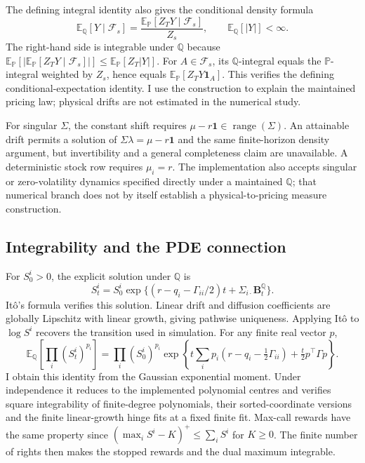 \documentclass[11pt]{article}
\newcommand{\E}{\mathbb E}
\newcommand{\Q}{\mathbb Q}
\newcommand{\F}{\mathcal F}
\begin{document}
The defining integral identity also gives the conditional density formula
\begin{equation}
 \E_\Q[Y\mid\F_s]
 =\frac{\E_{\mathbb P}[Z_TY\mid\F_s]}{Z_s},
 \qquad \E_\Q[|Y|]<\infty.
\label{eq:foundation-conditional-density}
\end{equation}
The right-hand side is integrable under $\Q$ because $\E_{\mathbb P}[|\E_{\mathbb P}[Z_TY\mid\F_s]|]\leq\E_{\mathbb P}[Z_T|Y|]$. For $A\in\F_s$, its $\Q$-integral equals the $\mathbb P$-integral weighted by $Z_s$, hence equals $\E_{\mathbb P}[Z_TY\mathbf1_A]$. This verifies the defining conditional-expectation identity. I use the construction to explain the maintained pricing law; physical drifts are not estimated in the numerical study.

For singular $\Sigma$, the constant shift requires $\mu-r\mathbf1\in\operatorname{range}(\Sigma)$. An attainable drift permits a solution of $\Sigma\lambda=\mu-r\mathbf1$ and the same finite-horizon density argument, but invertibility and a general completeness claim are unavailable. A deterministic stock row requires $\mu_i=r$. The implementation also accepts singular or zero-volatility dynamics specified directly under a maintained $\Q$; that numerical branch does not by itself establish a physical-to-pricing measure construction.

\subsection{Integrability and the PDE connection}

For $S_0^i>0$, the explicit solution under $\Q$ is
\begin{equation}
 S_t^i=S_0^i\exp\{(r-q_i-\Gamma_{ii}/2)t
                          +\Sigma_{i\cdot}\mathbf B_t^\Q\}.
\label{eq:foundation-explicit-sde}
\end{equation}
It\^o's formula verifies this solution. Linear drift and diffusion coefficients are globally Lipschitz with linear growth, giving pathwise uniqueness. Applying It\^o to $\log S^i$ recovers the transition used in simulation. For any finite real vector $p$,
\begin{equation}
 \E_\Q\!\left[\prod_i(S_t^i)^{p_i}\right]
 =\prod_i(S_0^i)^{p_i}
 \exp\!\left\{t\sum_i p_i(r-q_i-\tfrac12\Gamma_{ii})
                  +\tfrac t2 p^\top\Gamma p\right\}.
\label{eq:foundation-joint-moments}
\end{equation}
I obtain this identity from the Gaussian exponential moment. Under independence it reduces to the implemented polynomial centres and verifies square integrability of finite-degree polynomials, their sorted-coordinate versions and the finite linear-growth hinge fits at a fixed finite fit. Max-call rewards have the same property since $(\max_iS^i-K)^+\leq\sum_iS^i$ for $K\geq0$. The finite number of rights then makes the stopped rewards and the dual maximum integrable.
\end{document}
